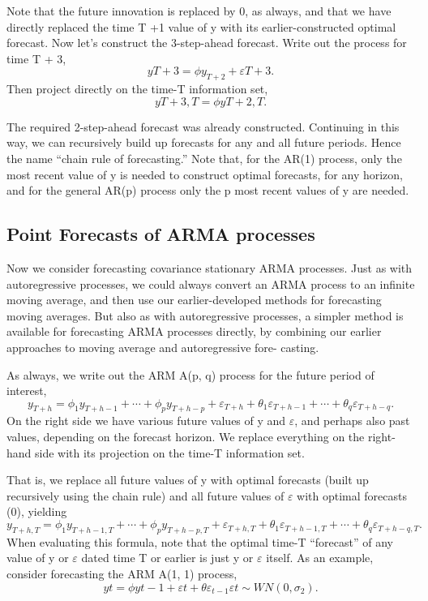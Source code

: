 \documentclass[]{article}
\begin{document}
Note that the future innovation is replaced by 0, as always, and that we
have directly replaced the time T +1 value of y with its
earlier-constructed optimal forecast. Now let's construct the
3-step-ahead forecast. Write out the process for time T + 3,
\[y T +3 = \phi y_{T+2} + \varepsilon T +3 .\] Then project directly on
the time-T information set, \[y T +3,T = \phi y{T +2,T} .\]

The required 2-step-ahead forecast was already constructed. Continuing
in this way, we can recursively build up forecasts for any and all
future periods. Hence the name ``chain rule of forecasting.'' Note that,
for the AR(1) process, only the most recent value of y is needed to
construct optimal forecasts, for any horizon, and for the general AR(p)
process only the p most recent values of y are needed.

\hypertarget{point-forecasts-of-arma-processes}{%
\subsection{Point Forecasts of ARMA
processes}\label{point-forecasts-of-arma-processes}}

Now we consider forecasting covariance stationary ARMA processes. Just
as with autoregressive processes, we could always convert an ARMA
process to an infinite moving average, and then use our
earlier-developed methods for forecasting moving averages. But also as
with autoregressive processes, a simpler method is available for
forecasting ARMA processes directly, by combining our earlier approaches
to moving average and autoregressive fore- casting.

As always, we write out the ARM A(p, q) process for the future period of
interest,
\[y_{T +h} = \phi_ 1 y_{T +h−1} + \cdots + \phi_ p y_{T +h−p} + \varepsilon_{T +h} + \theta_ 1 \varepsilon_{T +h−1} + \cdots + \theta_ q \varepsilon_ {T +h−q} .\]
On the right side we have various future values of y and
\(\varepsilon\), and perhaps also past values, depending on the forecast
horizon. We replace everything on the right-hand side with its
projection on the time-T information set.

That is, we replace all future values of y with optimal forecasts (built
up recursively using the chain rule) and all future values of
\(\varepsilon\) with optimal forecasts (0), yielding
\[y_{ T +h,T} = \phi _1 y_{T +h−1,T} + \cdots + \phi_p y_{T+h−p,T} + \varepsilon_{ T +h,T} + \theta_1 \varepsilon_{T +h−1,T }+ \cdots + \theta_q \varepsilon_{T +h−q,T} .\]
When evaluating this formula, note that the optimal time-T ``forecast''
of any value of y or \(\varepsilon\) dated time T or earlier is just y
or \(\varepsilon\) itself. As an example, consider forecasting the ARM
A(1, 1) process,
\[y t = \phi y t−1 + \varepsilon t + \theta\varepsilon_{t-1}
\varepsilon t ∼ W N (0, \sigma_2 ).\]
\end{document}
